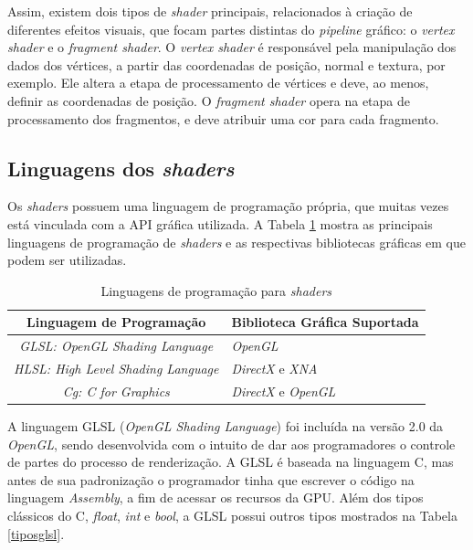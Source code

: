 	 Assim, existem dois tipos de \textit{shader} principais, relacionados à criação de diferentes efeitos visuais, que focam partes distintas do \textit{pipeline} gráfico: o \textit{vertex shader} e o \textit{fragment shader}. O \textit{vertex shader} é responsável pela manipulação dos dados dos vértices, a partir das coordenadas de posição, normal e textura, por exemplo. Ele altera a etapa de processamento de vértices e deve, ao menos, definir as coordenadas de posição.  O \textit{fragment shader} opera na etapa de processamento dos fragmentos, e deve atribuir uma cor para cada fragmento. 

\subsection{Linguagens dos \textit{shaders}}

	
	Os \textit{shaders} possuem uma linguagem de programação própria, que muitas vezes está vinculada com a API gráfica utilizada.  A Tabela \ref{lingshader} mostra as principais linguagens de programação de \textit{shaders} e as respectivas bibliotecas gráficas em que podem ser utilizadas. 

	\begin{table}[ht]
	\centering	
	\begin{tabularx}{0.9\textwidth}{cX}
		\toprule
		\textbf{Linguagem de Programação} & \textbf{Biblioteca Gráfica Suportada}  \\
		\midrule
		\textit{GLSL: OpenGL Shading Language} & \textit{OpenGL} \\
		\textit{HLSL: High Level Shading Language} & \textit{DirectX} e \textit{XNA} \\
		\textit{Cg: C for Graphics} & \textit{DirectX} e \textit{OpenGL}\\
		\bottomrule
	\end{tabularx}
	\caption{ Linguagens de programação para \textit{shaders}}
	\label{lingshader}
\end{table}

	A linguagem GLSL (\textit{OpenGL Shading Language}) foi incluída na versão 2.0 da  \textit{OpenGL}, sendo desenvolvida com o intuito de dar aos programadores o controle de partes do processo de renderização. A GLSL é baseada na linguagem C, mas antes de sua padronização o programador tinha que escrever o código na linguagem \textit{Assembly}, a fim de acessar os recursos da GPU. Além dos tipos clássicos do C, \textit{float}, \textit{int} e \textit{bool}, a GLSL possui outros tipos mostrados na Tabela \ref{tiposglsl}.

